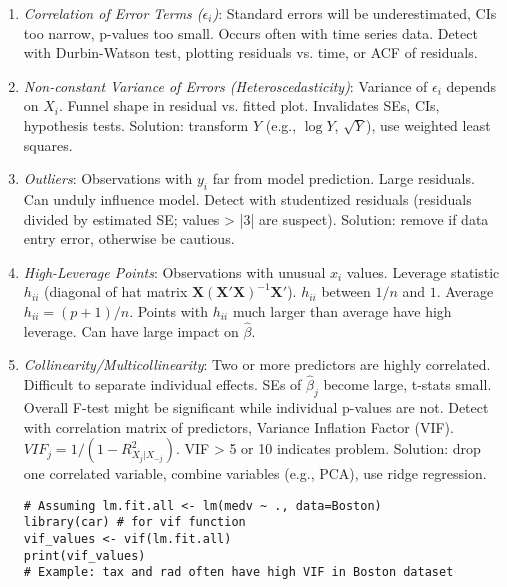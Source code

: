 \documentclass[12pt,a4paper]{article}
\begin{document}
\begin{itemize}
\begin{itemize}
\begin{enumerate}[label=\alph)]
                    \item \textit{Correlation of Error Terms ($\epsilon_i$)}: Standard errors will be underestimated, CIs too narrow, p-values too small. Occurs often with time series data. Detect with Durbin-Watson test, plotting residuals vs. time, or ACF of residuals.
                    \item \textit{Non-constant Variance of Errors (Heteroscedasticity)}: Variance of $\epsilon_i$ depends on $X_i$. Funnel shape in residual vs. fitted plot. Invalidates SEs, CIs, hypothesis tests. Solution: transform $Y$ (e.g., $\log Y$, $\sqrt{Y}$), use weighted least squares.
                    \item \textit{Outliers}: Observations with $y_i$ far from model prediction. Large residuals. Can unduly influence model. Detect with studentized residuals (residuals divided by estimated SE; values > |3| are suspect). Solution: remove if data entry error, otherwise be cautious.
                    \item \textit{High-Leverage Points}: Observations with unusual $x_i$ values. Leverage statistic $h_{ii}$ (diagonal of hat matrix $\mathbf{X}(\mathbf{X}'\mathbf{X})^{-1}\mathbf{X}'$). $h_{ii}$ between $1/n$ and $1$. Average $h_{ii} = (p+1)/n$. Points with $h_{ii}$ much larger than average have high leverage. Can have large impact on $\hat{\beta}$.
                    \item \textit{Collinearity/Multicollinearity}: Two or more predictors are highly correlated. Difficult to separate individual effects. SEs of $\hat{\beta}_j$ become large, t-stats small. Overall F-test might be significant while individual p-values are not. Detect with correlation matrix of predictors, Variance Inflation Factor (VIF). $VIF_j = 1/(1-R^2_{X_j|X_{-j}})$. VIF > 5 or 10 indicates problem. Solution: drop one correlated variable, combine variables (e.g., PCA), use ridge regression.
\begin{lstlisting}[caption={Checking VIF in R}]
# Assuming lm.fit.all <- lm(medv ~ ., data=Boston)
library(car) # for vif function
vif_values <- vif(lm.fit.all)
print(vif_values)
# Example: tax and rad often have high VIF in Boston dataset
\end{lstlisting}
                \end{enumerate}
        \end{itemize}


\end{itemize}
\end{document}
